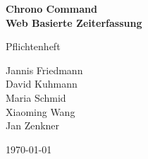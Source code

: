 \documentclass{scrartcl}
\begin{document}
	\setlength{\parindent}{0pt}

	\begin{titlepage}

		\begin{center}
			\huge \bfseries Chrono Command \\
			\large  Web Basierte Zeiterfassung
		\end{center}

		\begin{center}
				\large Pflichtenheft \\
		\end{center}

		\begin{center}
			Jannis Friedmann \\
			David Kuhmann \\
			Maria Schmid \\
			Xiaoming Wang \\
			Jan Zenkner \\

		\end{center}

		\begin{center}
			\large \today
		\end{center}
	
		\vfill
	\end{titlepage}
	\thispagestyle{empty}


	\clearpage
	\pagestyle{empty}
	\tableofcontents

	\clearpage
	\pagestyle{plain}
	\setcounter{page}{1}

	
	
	
	
	
	
	
	
	
	
	
	
\end{document}
